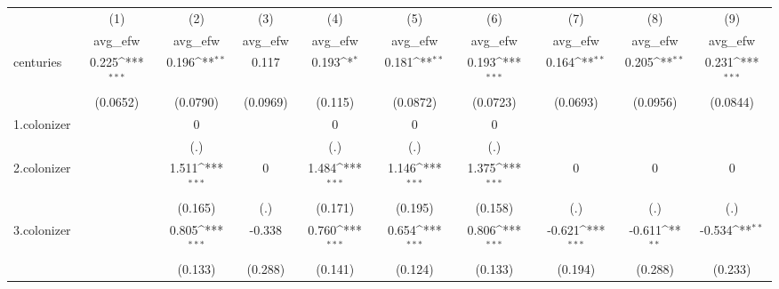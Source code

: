 {
\def\sym#1{\ifmmode^{#1}\else\(^{#1}\)\fi}
\begin{tabular}{l*{9}{c}}
\hline\hline
            &\multicolumn{1}{c}{(1)}&\multicolumn{1}{c}{(2)}&\multicolumn{1}{c}{(3)}&\multicolumn{1}{c}{(4)}&\multicolumn{1}{c}{(5)}&\multicolumn{1}{c}{(6)}&\multicolumn{1}{c}{(7)}&\multicolumn{1}{c}{(8)}&\multicolumn{1}{c}{(9)}\\
            &\multicolumn{1}{c}{avg\_efw}&\multicolumn{1}{c}{avg\_efw}&\multicolumn{1}{c}{avg\_efw}&\multicolumn{1}{c}{avg\_efw}&\multicolumn{1}{c}{avg\_efw}&\multicolumn{1}{c}{avg\_efw}&\multicolumn{1}{c}{avg\_efw}&\multicolumn{1}{c}{avg\_efw}&\multicolumn{1}{c}{avg\_efw}\\
\hline
centuries   &       0.225\sym{***}&       0.196\sym{**} &       0.117         &       0.193\sym{*}  &       0.181\sym{**} &       0.193\sym{***}&       0.164\sym{**} &       0.205\sym{**} &       0.231\sym{***}\\
            &    (0.0652)         &    (0.0790)         &    (0.0969)         &     (0.115)         &    (0.0872)         &    (0.0723)         &    (0.0693)         &    (0.0956)         &    (0.0844)         \\
[1em]
1.colonizer &                     &           0         &                     &           0         &           0         &           0         &                     &                     &                     \\
            &                     &         (.)         &                     &         (.)         &         (.)         &         (.)         &                     &                     &                     \\
[1em]
2.colonizer &                     &       1.511\sym{***}&           0         &       1.484\sym{***}&       1.146\sym{***}&       1.375\sym{***}&           0         &           0         &           0         \\
            &                     &     (0.165)         &         (.)         &     (0.171)         &     (0.195)         &     (0.158)         &         (.)         &         (.)         &         (.)         \\
[1em]
3.colonizer &                     &       0.805\sym{***}&      -0.338         &       0.760\sym{***}&       0.654\sym{***}&       0.806\sym{***}&      -0.621\sym{***}&      -0.611\sym{**} &      -0.534\sym{**} \\
            &                     &     (0.133)         &     (0.288)         &     (0.141)         &     (0.124)         &     (0.133)         &     (0.194)         &     (0.288)         &     (0.233)         \\

\end{tabular}}
